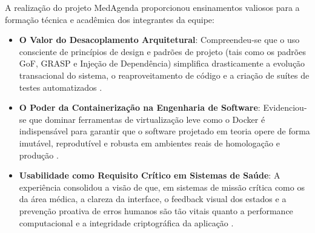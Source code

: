 A realização do projeto MedAgenda proporcionou ensinamentos valiosos para a formação técnica e acadêmica dos integrantes da equipe:
\begin{itemize}
    \item \textbf{O Valor do Desacoplamento Arquitetural}: Compreendeu-se que o uso consciente de princípios de design e padrões de projeto (tais como os padrões GoF, GRASP e Injeção de Dependência) simplifica drasticamente a evolução transacional do sistema, o reaproveitamento de código e a criação de suítes de testes automatizados \cite{gamma1995, larman2004}.
    \item \textbf{O Poder da Containerização na Engenharia de Software}: Evidenciou-se que dominar ferramentas de virtualização leve como o Docker é indispensável para garantir que o software projetado em teoria opere de forma imutável, reprodutível e robusta em ambientes reais de homologação e produção \cite{docker2023}.
    \item \textbf{Usabilidade como Requisito Crítico em Sistemas de Saúde}: A experiência consolidou a visão de que, em sistemas de missão crítica como os da área médica, a clareza da interface, o feedback visual dos estados e a prevenção proativa de erros humanos são tão vitais quanto a performance computacional e a integridade criptográfica da aplicação \cite{nielsen1993, silberschatz2020}.
\end{itemize}
